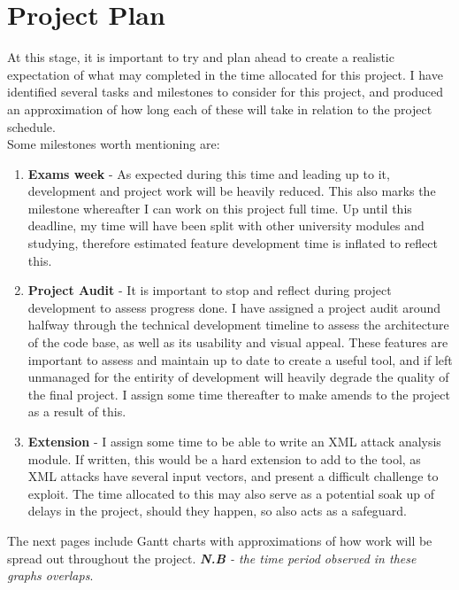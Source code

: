 \chapter{Project Plan}

At this stage, it is important to try and plan ahead to create a realistic expectation of what may completed in the time allocated for this project. I have identified several tasks and milestones to consider for this project, and produced an approximation of how long each of these will take in relation to the project schedule. \\

Some milestones worth mentioning are:

\begin{enumerate}
	\item \textbf{Exams week} - As expected during this time and leading up to it, development and project work will be heavily reduced. This also marks the milestone whereafter I can work on this project full time. Up until this deadline, my time will have been split with other university modules and studying, therefore estimated feature development time is inflated to reflect this.
	\item \textbf{Project Audit} - It is important to stop and reflect during project development to assess progress done. I have assigned a project audit around halfway through the technical development timeline to assess the architecture of the code base, as well as its usability and visual appeal. These features are important to assess and maintain up to date to create a useful tool, and if left unmanaged for the entirity of development will heavily degrade the quality of the final project. I assign some time thereafter to make amends to the project as a result of this.
	\item \textbf{Extension} - I assign some time to be able to write an XML attack analysis module. If written, this would be a hard extension to add to the tool, as XML attacks have several input vectors, and present a difficult challenge to exploit. The time allocated to this may also serve as a potential soak up of delays in the project, should they happen, so also acts as a safeguard.
\end{enumerate}

The next pages include Gantt charts with approximations of how work will be spread out throughout the project. \emph{\textbf{N.B} - the time period observed in these graphs overlaps}.

\newpage

